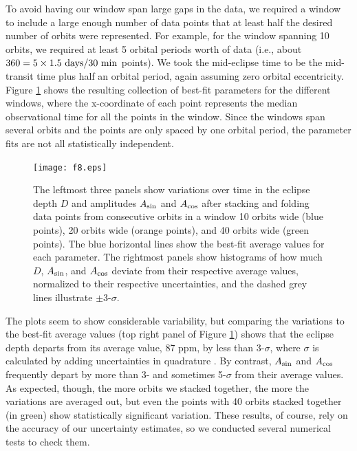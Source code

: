 \documentclass[manuscript]{aastex62}
\begin{document}
To avoid having our window span large gaps in the data, we required a window to include a large enough number of data points that at least half the desired number of orbits were represented. For example, for the window spanning 10 orbits, we required at least 5 orbital periods worth of data (i.e., about $360 = 5 \times 1.5\ {\rm days}/30\ {\rm min}$ points). We took the mid-eclipse time to be the mid-transit time plus half an orbital period, again assuming zero orbital eccentricity. Figure \ref{fig:planet-phase-curve-var_Analysis_of_Kepler76b} shows the resulting collection of best-fit parameters for the different windows, where the x-coordinate of each point represents the median observational time for all the points in the window. Since the windows span several orbits and the points are only spaced by one orbital period, the parameter fits are not all statistically independent.

\begin{figure}
\texttt{[image: f8.eps]}
\caption{The leftmost three panels show variations over time in the eclipse depth $D$ and amplitudes $A_{\rm sin}$ and $A_{\rm cos}$ after stacking and folding data points from consecutive orbits in a window 10 orbits wide (blue points), 20 orbits wide (orange points), and 40 orbits wide (green points). The blue horizontal lines show the best-fit average values for each parameter. The rightmost panels show histograms of how much $D$, $A_{\rm sin}$, and $A_{\rm cos}$ deviate from their respective average values, normalized to their respective uncertainties, and the dashed grey lines illustrate $\pm$3-$\sigma$. \label{fig:planet-phase-curve-var_Analysis_of_Kepler76b}}
\end{figure}

The plots seem to show considerable variability, but comparing the variations to the best-fit average values (top right panel of Figure \ref{fig:planet-phase-curve-var_Analysis_of_Kepler76b}) shows that the eclipse depth departs from its average value, 87 ppm, by less than 3-$\sigma$, where $\sigma$ is calculated by adding uncertainties in quadrature \citep[p.~58]{1997ieas.book.....T}. By contrast, $A_{\rm sin}$ and $A_{\rm cos}$ frequently depart by more than 3- and sometimes 5-$\sigma$ from their average values. As expected, though, the more orbits we stacked together, the more the variations are averaged out, but even the points with 40 orbits stacked together (in green) show statistically significant variation. These results, of course, rely on the accuracy of our uncertainty estimates, so we conducted several numerical tests to check them. 
\end{document}
